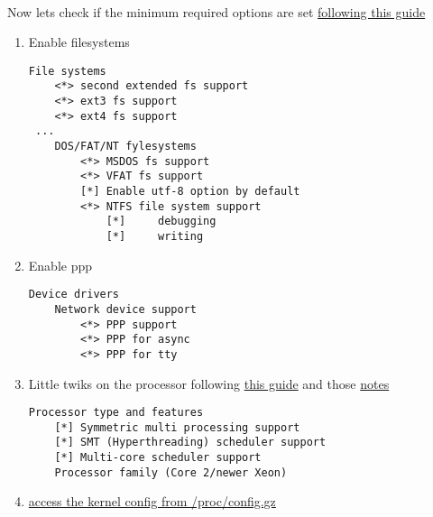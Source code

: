 \documentclass[10pt,a4paper]{article}
\begin{document}
                \newpage
                \paragraph{} Now lets check if the minimum required options are set \href{https://wiki.gentoo.org/wiki/Handbook:AMD64/Installation/Kernel#Activating_required_options}{following this guide}

                \begin{enumerate}

                    \item Enable filesystems
                        \begin{lstlisting}[style=KernelConfig]
 File systems
    <*> second extended fs support
    <*> ext3 fs support
    <*> ext4 fs support
 ...
    DOS/FAT/NT fylesystems
        <*> MSDOS fs support
        <*> VFAT fs support
        [*] Enable utf-8 option by default
        <*> NTFS file system support
            [*]     debugging
            [*]     writing
                        \end{lstlisting}

                    \newpage
                    \item Enable ppp

                        \begin{lstlisting}[style=KernelConfig]
 Device drivers
    Network device support
        <*> PPP support
        <*> PPP for async
        <*> PPP for tty
                         \end{lstlisting}


                     \newpage
                     \item Little twiks on the processor following \href{https://wiki.gentoo.org/wiki/Kernel/Gentoo_Kernel_Configuration_Guide#Multiprocessor.2C_Hyper-Threading_and_multi-core_systems}{this guide} and those \href{https://forums.gentoo.org/viewtopic-t-939150-start-0.html}{notes}

                        \begin{lstlisting}[style=KernelConfig]
 Processor type and features
    [*] Symmetric multi processing support
    [*] SMT (Hyperthreading) scheduler support
    [*] Multi-core scheduler support
    Processor family (Core 2/newer Xeon)
                        \end{lstlisting}

                    \newpage
                    \item \href{https://wiki.gentoo.org/wiki/Kernel/IKCONFIG_Support}{access the kernel config from /proc/config.gz}


\end{enumerate}
\end{document}
